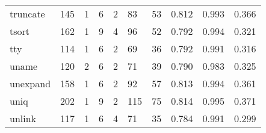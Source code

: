 \begin{longtable}{lp{2.0cm}p{2.0cm}p{2.0cm}p{2.0cm}p{2.0cm}p{2.0cm}p{2.0cm}p{2.0cm}p{2.0cm}}
truncate  &                    145 &                                  1 &                                 6 &                                2 &                                83 &                              53 &                                   0.812 &                                  0.993 &                                0.366 \\
tsort     &                    162 &                                  1 &                                 9 &                                4 &                                96 &                              52 &                                   0.792 &                                  0.994 &                                0.321 \\
tty       &                    114 &                                  1 &                                 6 &                                2 &                                69 &                              36 &                                   0.792 &                                  0.991 &                                0.316 \\
uname     &                    120 &                                  2 &                                 6 &                                2 &                                71 &                              39 &                                   0.790 &                                  0.983 &                                0.325 \\
unexpand  &                    158 &                                  1 &                                 6 &                                2 &                                92 &                              57 &                                   0.813 &                                  0.994 &                                0.361 \\
uniq      &                    202 &                                  1 &                                 9 &                                2 &                               115 &                              75 &                                   0.814 &                                  0.995 &                                0.371 \\
unlink    &                    117 &                                  1 &                                 6 &                                4 &                                71 &                              35 &                                   0.784 &                                  0.991 &                                0.299 \\

\end{longtable}
